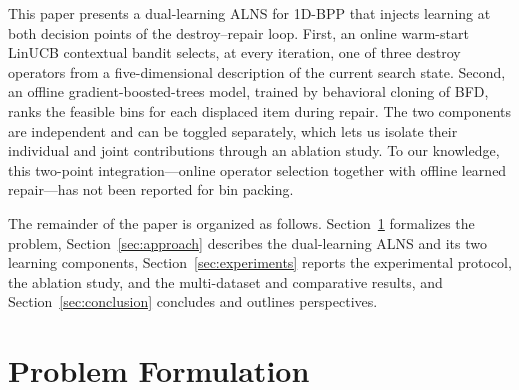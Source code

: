 \documentclass[conference]{IEEEtran}
\begin{document}
This paper presents a dual-learning ALNS for 1D-BPP that injects learning at both
decision points of the destroy--repair loop. First, an online warm-start LinUCB
contextual bandit selects, at every iteration, one of three destroy operators
from a five-dimensional description of the current search state. Second, an
offline gradient-boosted-trees model, trained by behavioral cloning of BFD, ranks
the feasible bins for each displaced item during repair. The two components are
independent and can be toggled separately, which lets us isolate their individual
and joint contributions through an ablation study. To our knowledge, this
two-point integration---online operator selection together with offline learned
repair---has not been reported for bin packing.

The remainder of the paper is organized as follows.
Section~\ref{sec:formulation} formalizes the problem,
Section~\ref{sec:approach} describes the dual-learning ALNS and its two learning
components, Section~\ref{sec:experiments} reports the experimental protocol, the
ablation study, and the multi-dataset and comparative results, and
Section~\ref{sec:conclusion} concludes and outlines perspectives.

\section{Problem Formulation}\label{sec:formulation}
\end{document}
